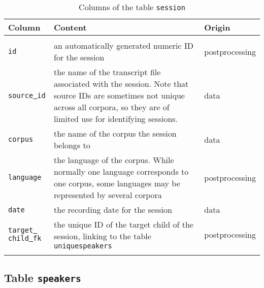 \documentclass[a4paper, 11pt]{book}
\newcommand{\und}{\underline{{ }}\hspace{0.2mm}}	%
\begin{document}
\begin{longtable}{lp{.5\linewidth}p{.2\linewidth}}
	\toprule
		\textbf{Column} & \textbf{Content} 	& \textbf{Origin} \\
	\midrule
	\endhead
		
	\bottomrule\\[-0.15cm]
	\caption{Columns of the table \texttt{session}}
	\endfoot
	
	
		\texttt{id}				& an automatically generated numeric ID for the session & postprocessing \\
		\texttt{source\und id}	& the name of the transcript file associated with the session. Note that source IDs are sometimes not unique across all corpora, 
			 					  so they are of limited use for identifying sessions. & data \\
		\texttt{corpus}			& the name of the corpus the session belongs to & data \\
		\texttt{language}		& the language of the corpus. While normally one language corresponds to one corpus, some languages may be represented by several corpora & postprocessing \\
		\texttt{date} 			& the recording date for the session & data \\ 
		\texttt{target\und child\und fk}  & the unique ID of the target child of the session, linking to the table \texttt{uniquespeakers} & postprocessing \\ 
		\label{tab:Table sessions}
\end{longtable}


\subsection{Table \texttt{speakers}}
\label{subsec:Table speakers}
\end{document}
